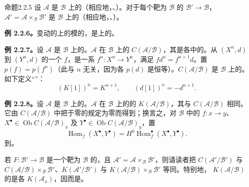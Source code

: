 \begin{SGAresult}{命题}{2.2.5}
设 $\mathcal A$ 是 $\mathcal B$ 上的（相应地，、）。对于每个靶为 $\mathcal B$ 的 $\mathcal B'\to\mathcal B$， $\mathcal A'=\mathcal A\times_{\mathcal B}\mathcal B'$ 是 $\mathcal B$ 上的（相应地，、）。
\end{SGAresult}
\textbf{例 2.2.6。}变动的上的模的，是上的。

\textbf{例 2.2.7。}设 $\mathcal A$ 是 $\mathcal B$ 上的。$\mathcal A$ 在 $\mathcal B$ 上的 $C(\mathcal A/\mathcal B)$，其是各中的。从 $(X^n,d)$ 到 $(Y^n,d)$ 的一个 $f$，是一系 $f^n:X^n\to Y^n$，满足 $fd^n=f^{n+1}d$。置 $p(f)=p(f^n)$（此与 $n$ 无关，因为各 $p(d)$ 是恒等）。$C(\mathcal A/\mathcal B)$ 是 $\mathcal B$ 上的。如下定义“”：
\[
(K[1])^n=K^{n+1},\qquad(d[1])^n=-d^{n+1}.
\]

\textbf{例 2.2.8。}设 $\mathcal A$ 是 $\mathcal B$ 上的。$\mathcal A$ 在 $\mathcal B$ 上的的 $K(\mathcal A/\mathcal B)$，其与 $C(\mathcal A/\mathcal B)$ 相同。它由 $C(\mathcal A/\mathcal B)$ 中把于零的规定为零而得到；换言之，对 $\mathcal B$ 中的 $f:x\to y$、$X^{\bullet}\in\operatorname{Ob}C(\mathcal A/\mathcal B)_x$ 及 $Y^{\bullet}\in\operatorname{Ob}C(\mathcal A/\mathcal B)_y$，置
\[
\operatorname{Hom}_f(X^{\bullet},Y^{\bullet})=H^0\operatorname{Hom}^{\bullet}_f(X^{\bullet},Y^{\bullet}).
\]
到。

若 $F:\mathcal B'\to\mathcal B$ 是一个靶为 $\mathcal B$ 的，且 $\mathcal A'=\mathcal A\times_{\mathcal B}\mathcal B'$，则请读者把 $C(\mathcal A'/\mathcal B')$ 与 $C(\mathcal A/\mathcal B)\times_{\mathcal B}\mathcal B'$、$K(\mathcal A'/\mathcal B')$ 与 $K(\mathcal A/\mathcal B)\times_{\mathcal B}\mathcal B'$ 等同。特别地， $K(\mathcal A/\mathcal B)$ 的是各 $K(\mathcal A_x)$，因而是。

